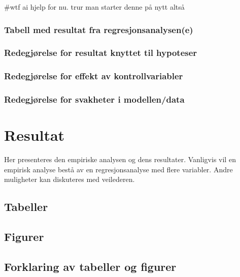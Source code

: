 \documentclass[
  12pt,
  a4paper,
  DIV=11,
  numbers=noendperiod]{scrartcl}
\begin{document}
\#wtf ai hjelp for nu. trur man starter denne på nytt altså

\subsubsection{Tabell med resultat fra
regresjonsanalysen(e)}\label{tabell-med-resultat-fra-regresjonsanalysene}

\subsubsection{Redegjørelse for resultat knyttet til
hypoteser}\label{redegjuxf8relse-for-resultat-knyttet-til-hypoteser}

\subsubsection{Redegjørelse for effekt av
kontrollvariabler}\label{redegjuxf8relse-for-effekt-av-kontrollvariabler}

\subsubsection{Redegjørelse for svakheter i
modellen/data}\label{redegjuxf8relse-for-svakheter-i-modellendata}

\newpage

\section{Resultat}\label{resultat}

Her presenteres den empiriske analysen og dens resultater. Vanligvis vil
en empirisk analyse bestå av en regresjonsanalyse med flere variabler.
Andre muligheter kan diskuteres med veilederen.

\subsection{Tabeller}\label{tabeller}

\subsection{Figurer}\label{figurer}

\subsection{Forklaring av tabeller og
figurer}\label{forklaring-av-tabeller-og-figurer}
\end{document}
